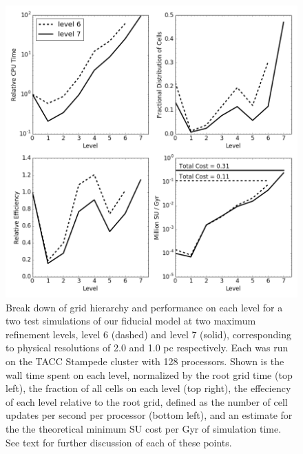 \documentclass[11pt]{article}
\begin{document}
\begin{figure}
\centering
\includegraphics[width=0.95\linewidth]{enzo_levels}
\caption{Break down of grid hierarchy and performance on each level for a two test simulations of our fiducial model at two maximum refinement levels, level 6 (dashed) and level 7 (solid), corresponding to physical resolutions of 2.0 and 1.0 pc respectively. Each was run on the TACC Stampede cluster with 128 processors. Shown is the wall time spent on each level, normalized by the root grid time (top left), the fraction of all cells on each level (top right), the effeciency of each level relative to the root grid, defined as the number of cell updates per second per processor (bottom left), and an estimate for the the theoretical minimum SU cost per Gyr of simulation time. See text for further discussion of each of these points.}
\label{fig:levels}
\end{figure}
\end{document}

